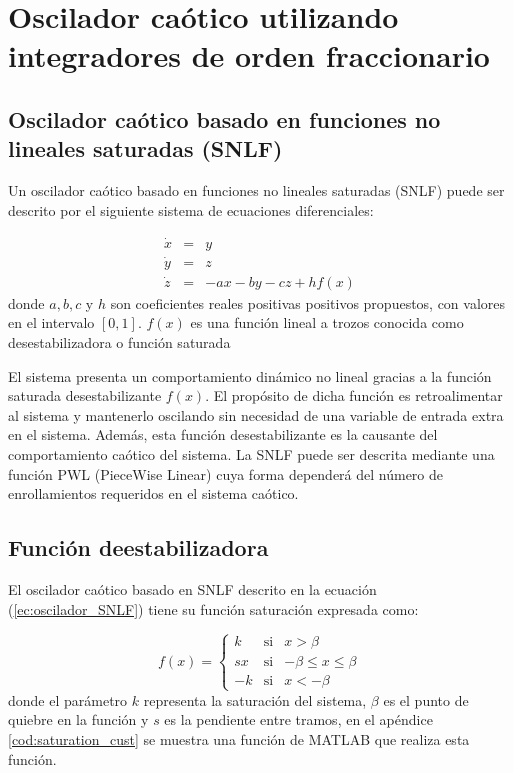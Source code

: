 \chapter{Oscilador caótico utilizando integradores de orden fraccionario}

	\section{Oscilador caótico basado en funciones no lineales saturadas (SNLF)}
	
	Un oscilador caótico basado en funciones no lineales saturadas (SNLF) puede ser descrito por el siguiente sistema de ecuaciones diferenciales:

	\begin{equation} 
		\begin{array}{lcl}
		\dot{x} & = & y \\
		\dot{y} & = & z\\
		\dot{z} & = & -ax - by -cz + hf(x)
		\end{array}
		\label{ec:oscilador_SNLF}
	\end{equation}
	donde  $a, b, c$ y $h$ son coeficientes reales positivas positivos propuestos, con valores en el intervalo $[0, 1]$. $f(x)$ es una función lineal a trozos conocida como desestabilizadora o función saturada
	 
	 El sistema presenta un comportamiento dinámico no lineal gracias a la función saturada desestabilizante $f(x)$. El propósito de dicha función es retroalimentar al sistema y mantenerlo oscilando sin necesidad de una variable de entrada extra en el sistema. Además, esta función desestabilizante es la causante del comportamiento caótico del sistema. La SNLF puede ser descrita mediante una función PWL (PieceWise Linear) cuya forma dependerá del número de enrollamientos requeridos en el sistema caótico.
		
		\section{Función deestabilizadora}
	 El oscilador caótico basado en SNLF descrito en la ecuación (\ref{ec:oscilador_SNLF}) tiene su función saturación expresada como:
	 
	 \begin{equation}
		f(x) = \left\{ \begin{array}{lcl}
		k & \mathrm{si} & x > \beta \\
		sx & \mathrm{si} & - \beta \leq x \leq \beta  \\
		-k & \mathrm{si} & x < -\beta
		\end{array}
		\right.
		\label{ec:saturacion}
	\end{equation}
	donde el parámetro $k$ representa la saturación del sistema, $\beta$ es el punto de quiebre en la función y $s$ es la pendiente entre tramos, en el apéndice \ref{cod:saturation_cust} se muestra una función de MATLAB que realiza esta función. 
	
